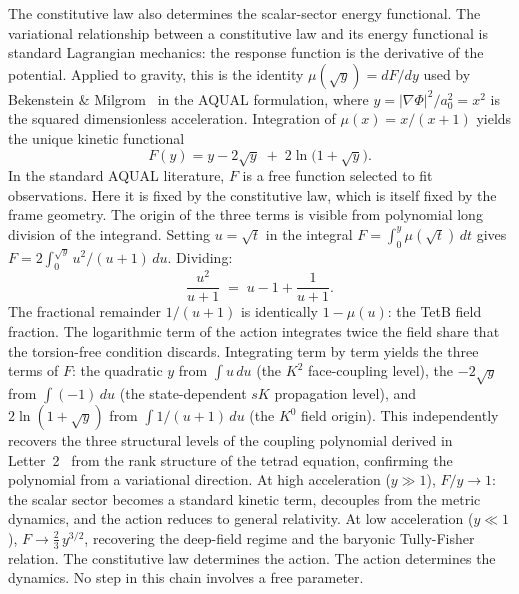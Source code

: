 \documentclass[twocolumn]{iopjournal}
\begin{document}
The constitutive law also determines the scalar-sector
energy functional.  The variational relationship between a
constitutive law and its energy functional is standard
Lagrangian mechanics: the response function is the derivative
of the potential.  Applied to gravity, this is the identity
$\mu(\sqrt{y}) = dF/dy$ used by Bekenstein \&
Milgrom~\cite{BekensteinMilgrom1984} in the AQUAL
formulation, where
$y = |\nabla\Phi|^2/a_0^2 = x^2$ is the squared
dimensionless acceleration.  Integration of
$\mu(x) = x/(x{+}1)$ yields the unique kinetic functional
\begin{equation}
  F(y) = y - 2\sqrt{y} \;+\; 2\ln\!\bigl(1 + \sqrt{y}\bigr).
  \label{eq:F}
\end{equation}
In the standard AQUAL literature, $F$ is a free function
selected to fit observations.  Here it is fixed by the
constitutive law, which is itself fixed by the frame geometry.
The origin of the three terms is visible from polynomial long
division of the integrand.  Setting $u = \sqrt{t}$ in the
integral $F = \int_0^y \mu(\sqrt{t})\,dt$ gives
$F = 2\int_0^{\sqrt{y}} u^2/(u{+}1)\,du$.  Dividing:
\begin{equation}
  \frac{u^2}{u+1} \;=\; u - 1 + \frac{1}{u+1}.
  \label{eq:longdiv}
\end{equation}
The fractional remainder $1/(u{+}1)$ is identically
$1 - \mu(u)$: the TetB field fraction.  The logarithmic term
of the action integrates twice the field share that the
torsion-free condition discards.
Integrating term by term yields the three terms of $F$: the
quadratic $y$ from $\int u\,du$ (the $K^2$ face-coupling
level), the $-2\sqrt{y}$ from $\int(-1)\,du$ (the
state-dependent $sK$ propagation level), and
$2\ln(1{+}\sqrt{y})$ from $\int 1/(u{+}1)\,du$ (the $K^0$
field origin).  This independently recovers the three
structural levels of the coupling polynomial derived in
Letter~2~\cite{Nelson2026b} from the rank structure of the
tetrad equation, confirming the polynomial from a
variational direction.  At high acceleration ($y \gg 1$),
$F/y \to 1$: the scalar sector becomes a standard kinetic term,
decouples from the metric dynamics, and the action reduces to
general relativity.  At
low acceleration ($y \ll 1$), $F \to \tfrac{2}{3}\,y^{3/2}$,
recovering the deep-field regime and the baryonic Tully-Fisher
relation.  The constitutive law determines the action.  The
action determines the dynamics.  No step in this chain
involves a free parameter.
\end{document}
